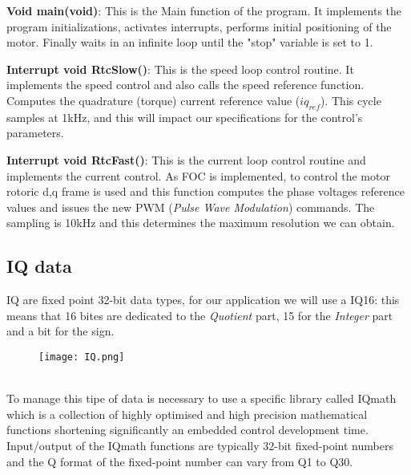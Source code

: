 \documentclass[12pt]{article}
\begin{document}
\textbf{Void main(void)}:
This is the Main function of the program. It implements the program initializations, activates interrupts, performs initial positioning of the motor. Finally waits in an infinite loop until the "stop" variable is set to 1.

\textbf{Interrupt void RtcSlow()}:
This is the speed loop control routine.
It implements the speed control and also calls the speed reference function. Computes the quadrature (torque)
current reference value ($iq_{ref}$).
This cycle samples at 1kHz, and this will impact our specifications for the control's parameters.

\textbf{Interrupt void RtcFast()}:
This is the current loop control routine and implements the current control. As FOC is implemented, to control the motor rotoric d,q frame is used and this function computes the phase voltages reference values and issues the new PWM (\textit{Pulse Wave Modulation}) commands. The sampling is 10kHz and this determines the maximum resolution we can obtain. 

\subsection{IQ data}

IQ are fixed point 32-bit data types, for our application we will use a IQ16: this means that 16 bites are dedicated to the \textit{Quotient} part, 15 for the \textit{Integer} part and a bit for the sign.
\begin{figure}[h]
\centering
\texttt{[image: IQ.png]}
\end{figure}\\  
To manage this tipe of data is necessary to use a specific library called IQmath which is a collection of highly
optimised and high precision mathematical functions shortening significantly an embedded control development time. 
Input/output of the IQmath functions are typically 32-bit fixed-point numbers and the Q format of
the fixed-point number can vary from Q1 to Q30.
\end{document}
